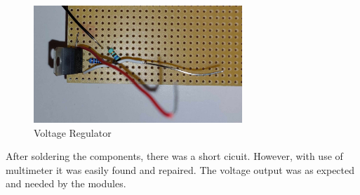 \begin{figure}[H]
    \centering
    \includegraphics[width=0.7\textwidth]{voltagereg.jpg}
    \caption{Voltage Regulator}
    \label{Figure: Voltage Regulator}
\end{figure}

After soldering the components, there was a short cicuit. However, with use of multimeter it was easily found and repaired. 
The voltage output was as expected and needed by the modules.